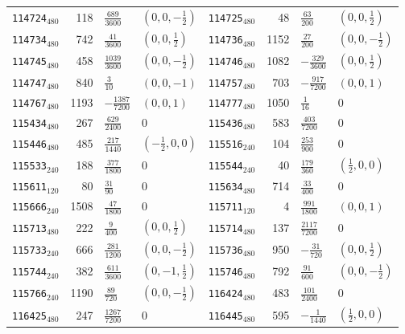 {\begin{longtable}{@{}lrll@{\hspace{2em}}lrll@{}}
\texttt{114724}$_{480}$ & 118 & $\tfrac{689}{3600}$ & $(0,0,-\tfrac{1}{2})$ & \texttt{114725}$_{480}$ & 48 & $\tfrac{63}{200}$ & $(0,0,\tfrac{1}{2})$\\
\texttt{114734}$_{480}$ & 742 & $\tfrac{41}{3600}$ & $(0,0,\tfrac{1}{2})$ & \texttt{114736}$_{480}$ & 1152 & $\tfrac{27}{200}$ & $(0,0,-\tfrac{1}{2})$\\
\texttt{114745}$_{480}$ & 458 & $\tfrac{1039}{3600}$ & $(0,0,-\tfrac{1}{2})$ & \texttt{114746}$_{480}$ & 1082 & $-\tfrac{329}{3600}$ & $(0,0,\tfrac{1}{2})$\\
\texttt{114747}$_{480}$ & 840 & $\tfrac{3}{10}$ & $(0,0,-1)$ & \texttt{114757}$_{480}$ & 703 & $-\tfrac{917}{7200}$ & $(0,0,1)$\\
\texttt{114767}$_{480}$ & 1193 & $-\tfrac{1387}{7200}$ & $(0,0,1)$ & \texttt{114777}$_{480}$ & 1050 & $\tfrac{1}{16}$ & 0\\
\texttt{115434}$_{480}$ & 267 & $\tfrac{629}{2400}$ & 0 & \texttt{115436}$_{480}$ & 583 & $\tfrac{403}{7200}$ & 0\\
\texttt{115446}$_{480}$ & 485 & $\tfrac{217}{1440}$ & $(-\tfrac{1}{2},0,0)$ & \texttt{115516}$_{240}$ & 104 & $\tfrac{253}{900}$ & 0\\
\texttt{115533}$_{240}$ & 188 & $\tfrac{377}{1800}$ & 0 & \texttt{115544}$_{240}$ & 40 & $\tfrac{179}{360}$ & $(\tfrac{1}{2},0,0)$\\
\texttt{115611}$_{120}$ & 80 & $\tfrac{31}{90}$ & 0 & \texttt{115634}$_{480}$ & 714 & $\tfrac{33}{400}$ & 0\\
\texttt{115666}$_{240}$ & 1508 & $\tfrac{47}{1800}$ & 0 & \texttt{115711}$_{120}$ & 4 & $\tfrac{991}{1800}$ & $(0,0,1)$\\
\texttt{115713}$_{480}$ & 222 & $\tfrac{9}{400}$ & $(0,0,\tfrac{1}{2})$ & \texttt{115714}$_{480}$ & 137 & $\tfrac{2117}{7200}$ & 0\\
\texttt{115733}$_{240}$ & 666 & $\tfrac{281}{1200}$ & $(0,0,-\tfrac{1}{2})$ & \texttt{115736}$_{480}$ & 950 & $-\tfrac{31}{720}$ & $(0,0,\tfrac{1}{2})$\\
\texttt{115744}$_{240}$ & 382 & $\tfrac{611}{3600}$ & $(0,-1,\tfrac{1}{2})$ & \texttt{115746}$_{480}$ & 792 & $\tfrac{91}{600}$ & $(0,0,-\tfrac{1}{2})$\\
\texttt{115766}$_{240}$ & 1190 & $\tfrac{89}{720}$ & $(0,0,-\tfrac{1}{2})$ & \texttt{116424}$_{480}$ & 483 & $\tfrac{101}{2400}$ & 0\\
\texttt{116425}$_{480}$ & 247 & $\tfrac{1267}{7200}$ & 0 & \texttt{116445}$_{480}$ & 595 & $-\tfrac{1}{1440}$ & $(\tfrac{1}{2},0,0)$\\

\end{longtable}}
